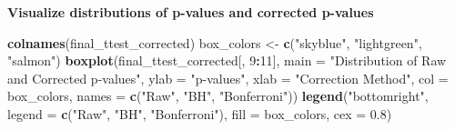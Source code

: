 \documentclass[
  11pt,
]{article}
\newenvironment{Shaded}{\begin{snugshade}}{\end{snugshade}}
\newcommand{\AttributeTok}[1]{\textcolor[rgb]{0.13,0.29,0.53}{#1}}
\newcommand{\DecValTok}[1]{\textcolor[rgb]{0.00,0.00,0.81}{#1}}
\newcommand{\FloatTok}[1]{\textcolor[rgb]{0.00,0.00,0.81}{#1}}
\newcommand{\FunctionTok}[1]{\textcolor[rgb]{0.13,0.29,0.53}{\textbf{#1}}}
\newcommand{\NormalTok}[1]{#1}
\newcommand{\OtherTok}[1]{\textcolor[rgb]{0.56,0.35,0.01}{#1}}
\newcommand{\SpecialCharTok}[1]{\textcolor[rgb]{0.81,0.36,0.00}{\textbf{#1}}}
\newcommand{\StringTok}[1]{\textcolor[rgb]{0.31,0.60,0.02}{#1}}
\begin{document}
\begin{Shaded}
\end{Shaded}

\textbf{Visualize distributions of p-values and corrected p-values}

\begin{Shaded}
\begin{Highlighting}[]
\FunctionTok{colnames}\NormalTok{(final\_ttest\_corrected)}
\NormalTok{box\_colors }\OtherTok{\textless{}{-}} \FunctionTok{c}\NormalTok{(}\StringTok{"skyblue"}\NormalTok{, }\StringTok{"lightgreen"}\NormalTok{, }\StringTok{"salmon"}\NormalTok{)}
\FunctionTok{boxplot}\NormalTok{(final\_ttest\_corrected[, }\DecValTok{9}\SpecialCharTok{:}\DecValTok{11}\NormalTok{],}
        \AttributeTok{main =} \StringTok{"Distribution of Raw and Corrected p{-}values"}\NormalTok{,}
        \AttributeTok{ylab =} \StringTok{"p{-}values"}\NormalTok{,}
        \AttributeTok{xlab =} \StringTok{"Correction Method"}\NormalTok{,}
        \AttributeTok{col =}\NormalTok{ box\_colors,}
        \AttributeTok{names =} \FunctionTok{c}\NormalTok{(}\StringTok{"Raw"}\NormalTok{, }\StringTok{"BH"}\NormalTok{, }\StringTok{"Bonferroni"}\NormalTok{))}
\FunctionTok{legend}\NormalTok{(}\StringTok{"bottomright"}\NormalTok{,}
       \AttributeTok{legend =} \FunctionTok{c}\NormalTok{(}\StringTok{"Raw"}\NormalTok{, }\StringTok{"BH"}\NormalTok{, }\StringTok{"Bonferroni"}\NormalTok{),}
       \AttributeTok{fill =}\NormalTok{ box\_colors,}
       \AttributeTok{cex =} \FloatTok{0.8}\NormalTok{)}
\end{Highlighting}
\end{Shaded}
\end{document}
